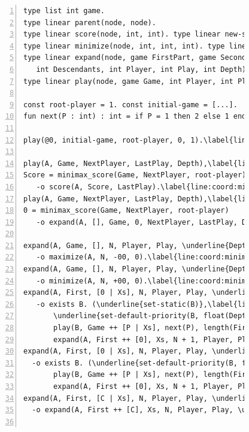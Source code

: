 \begin{figure}[ht]
\begin{Verbatim}[numbers=left,commandchars=\\\{\},fontsize=\codesize]
type list int game.
type linear parent(node, node).
type linear score(node, int, int). type linear new-score(node, int, int).
type linear minimize(node, int, int, int). type linear maximize(node, int, int, int).
type linear expand(node, game FirstPart, game SecondPart,
   int Descendants, int Player, int Play, int Depth).
type linear play(node, game Game, int Player, int Play, int Depth).

const root-player = 1. const initial-game = [...].
fun next(P : int) : int = if P = 1 then 2 else 1 end.

play(@0, initial-game, root-player, 0, 1).\label{line:coord:minimax_axiom}

play(A, Game, NextPlayer, LastPlay, Depth),\label{line:coord:minimax_play1}\label{line:coord:minimax_play11}
Score = minimax_score(Game, NextPlayer, root-player), Score > 0
   -o score(A, Score, LastPlay).\label{line:coord:minimax_play12}
play(A, Game, NextPlayer, LastPlay, Depth),\label{line:coord:minimax_play21}
0 = minimax_score(Game, NextPlayer, root-player)
   -o expand(A, [], Game, 0, NextPlayer, LastPlay, Depth).\label{line:coord:minimax_play2}\label{line:coord:minimax_play22}

expand(A, Game, [], N, Player, Play, \underline{Depth}), Player = root-player\label{line:coord:minimax_expand1}\label{line:coord:minimax_rule11}
   -o maximize(A, N, -00, 0).\label{line:coord:minimax_rule12}
expand(A, Game, [], N, Player, Play, \underline{Depth}), Player <> root-player\label{line:coord:minimax_rule21}
   -o minimize(A, N, +00, 0).\label{line:coord:minimax_rule22}
expand(A, First, [0 | Xs], N, Player, Play, \underline{Depth}), Depth >= 5\label{line:coord:minimax_rule31}
   -o exists B. (\underline{set-static(B)},\label{line:coord:minimax_coord1}
       \underline{set-default-priority(B, float(Depth + 1))},\label{line:coord:minimax_coord2}
       play(B, Game ++ [P | Xs], next(P), length(First), \underline{Depth + 1}), parent(B, A).
       expand(A, First ++ [0], Xs, N + 1, Player, Play, \underline{Depth})).\label{line:coord:minimax_rule32}
expand(A, First, [0 | Xs], N, Player, Play, \underline{Depth}), Depth < 5\label{line:coord:minimax_rule41}
  -o exists B. (\underline{set-default-priority(B, float(Depth + 1))},\label{line:coord:minimax_coord3}
       play(B, Game ++ [P | Xs], next(P), length(First), \underline{Depth + 1}), parent(B, A),
       expand(A, First ++ [0], Xs, N + 1, Player, Play, \underline{Depth})).\label{line:coord:minimax_rule42}
expand(A, First, [C | Xs], N, Player, Play, \underline{Depth}) C <> 0\label{line:coord:minimax_expand11}\label{line:coord:minimax_rule51}
  -o expand(A, First ++ [C], Xs, N, Player, Play, \underline{Depth}).\label{line:coord:minimax_expand2}\label{line:coord:minimax_rule52}


\end{Verbatim}
\end{figure}
